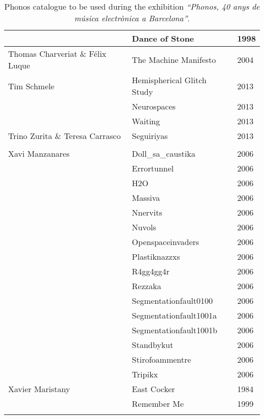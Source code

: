 \begin{center}
\begin{longtable}{ p{}  p{}  p{} }
& Dance of Stone & 1998 \\ \midrule 
Thomas Charveriat \& Félix Luque & The Machine Manifesto & 2004 \\ \midrule 
Tim Schmele & Hemispherical Glitch Study & 2013 \\ \cmidrule (r){2-3} 
& Neurospaces & 2013 \\ \cmidrule (r){2-3} 
& Waiting & 2013 \\ \midrule 
Trino Zurita \& Teresa Carrasco & Seguiriyas & 2013 \\ \midrule \\ \midrule 
Xavi Manzanares & Doll\_sa\_caustika & 2006 \\ \cmidrule (r){2-3} 
& Errortunnel & 2006 \\ \cmidrule (r){2-3} 
& H2O & 2006 \\ \cmidrule (r){2-3} 
& Massiva & 2006 \\ \cmidrule (r){2-3} 
& Nnervits & 2006 \\ \cmidrule (r){2-3} 
& Nuvols & 2006 \\ \cmidrule (r){2-3} 
& Openspaceinvaders & 2006 \\ \cmidrule (r){2-3} 
& Plastiknazzxs & 2006 \\ \cmidrule (r){2-3} 
& R4gg4gg4r & 2006 \\ \cmidrule (r){2-3} 
& Rezzaka & 2006 \\ \cmidrule (r){2-3} 
& Segmentationfault0100 & 2006 \\ \cmidrule (r){2-3} 
& Segmentationfault1001a & 2006 \\ \cmidrule (r){2-3} 
& Segmentationfault1001b & 2006 \\ \cmidrule (r){2-3} 
& Standbykut & 2006 \\ \cmidrule (r){2-3} 
& Stirofoammentre & 2006 \\ \cmidrule (r){2-3} 
& Tripikx & 2006 \\ \midrule 
Xavier Maristany & East Cocker & 1984 \\ \cmidrule (r){2-3} 
& Remember Me & 1999 \\ \bottomrule 
\caption[Phonos catalogue of songs]{Phonos catalogue to be used during the exhibition \textit{``Phonos, 40 anys de música electrònica a Barcelona''}.}
\label{table:phonosCatalogue}
\end{longtable}
\end{center}